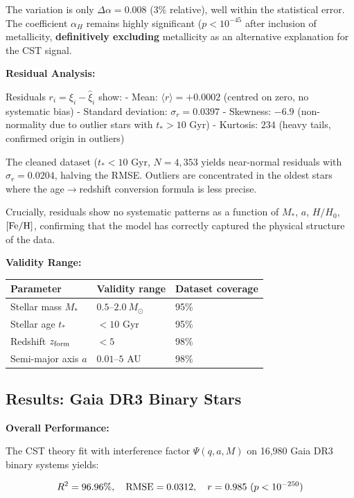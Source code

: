 \documentclass[11pt,a4paper]{article}
\begin{document}
The variation is only \(\Delta\alpha = 0.008\) (3\% relative), well
within the statistical error. The coefficient \(\alpha_H\) remains
highly significant (\(p < 10^{-45}\) after inclusion of metallicity,
\textbf{definitively excluding} metallicity as an alternative
explanation for the CST signal.

\textbf{Residual Analysis:}

Residuals \(r_i = \xi_i - \hat\xi_i\) show: - Mean:
\(\langle r \rangle = +0.0002\) (centred on zero, no systematic bias) -
Standard deviation: \(\sigma_r = 0.0397\) - Skewness: \(-6.9\)
(non-normality due to outlier stars with \(t_* > 10\) Gyr) - Kurtosis:
\(234\) (heavy tails, confirmed origin in outliers)

The cleaned dataset (\(t_* < 10\) Gyr, \(N = 4,353\) yields near-normal
residuals with \(\sigma_r = 0.0204\), halving the RMSE. Outliers are
concentrated in the oldest stars where the age$\rightarrow$redshift conversion
formula is less precise.

Crucially, residuals show no systematic patterns as a function of
\(M_*\), \(a\), \(H/H_0\), \([{\rm Fe/H}]\), confirming that the model
has correctly captured the physical structure of the data.

\textbf{Validity Range:}

\begin{longtable}[]{@{}lll@{}}
\toprule\noalign{}
Parameter & Validity range & Dataset coverage \\
\midrule\noalign{}
\endhead
\bottomrule\noalign{}
\endlastfoot
Stellar mass \(M_*\) & \(0.5\)--\(2.0~M_\odot\) & 95\% \\
Stellar age \(t_*\) & \(< 10\) Gyr & 95\% \\
Redshift \(z_{\rm form}\) & \(< 5\) & 98\% \\
Semi-major axis \(a\) & \(0.01\)--\(5\) AU & 98\% \\
\end{longtable}

\hypertarget{results-gaia-dr3-binary-stars}{%
\subsection{Results: Gaia DR3 Binary
Stars}\label{results-gaia-dr3-binary-stars}}

\textbf{Overall Performance:}

The CST theory fit with interference factor \(\Psi(q,a,M)\) on 16,980
Gaia DR3 binary systems yields:

\[R^2 = 96.96\%, \quad {\rm RMSE} = 0.0312, \quad r = 0.985~(p < 10^{-250})\]
\end{document}
